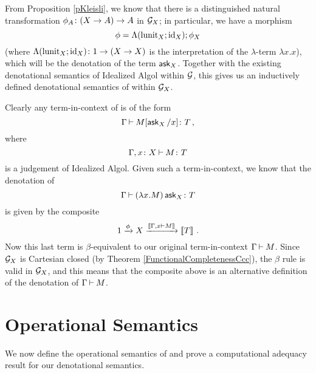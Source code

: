 From Proposition \ref{pKleisli}, we know that there is a distinguished natural transformation $\phi_A \colon (X \to A) \to A$ in $\mathcal G_X$; in particular, we have a morphism
\[
  \phi = \Lambda(\operatorname{lunit}_X;\operatorname{id}_X);\phi_X
  \]
(where $\Lambda(\operatorname{lunit}_X;\operatorname{id}_X)\colon 1 \to (X \to X)$ is the interpretation of the $\lambda$-term $\lambda x.x$), which will be the denotation of the term $\operatorname{{\mathsf{ask}}}_X$.
Together with the existing denotational semantics of Idealized Algol within $\mathcal G$, this gives us an inductively defined denotational semantics of \IAX within $\mathcal G_X$.

Clearly any term-in-context of \IAX is of the form
\[
  \Gamma \mathbin{\vdash} M[\operatorname{{\mathsf{ask}}}_X/x]\colon T\,,
  \]
where
\[
  \Gamma,x\colon X \mathbin{\vdash} M \colon T
  \]
is a judgement of Idealized Algol.
Given such a term-in-context, we know that the denotation of
\[
  \Gamma\mathbin{\vdash} (\lambda x.M) \operatorname{{\mathsf{ask}}}_X \colon T
  \]
is given by the composite
\[
  1 \xrightarrow{\phi}
  X \xrightarrow{\left\llbracket\Gamma,x \mathbin{\vdash} M\right\rrbracket}
  \left\llbracket T\right\rrbracket\,.
  \]
Now this last term is $\beta$-equivalent to our original term-in-context $\Gamma\mathbin{\vdash} M$.  
Since $\mathcal G_X$ is Cartesian closed (by Theorem \ref{FunctionalCompletenessCcc}), the $\beta$ rule is valid in $\mathcal G_X$, and this means that the composite above is an alternative definition of the denotation of $\Gamma\mathbin{\vdash} M$.

\section{Operational Semantics}

We now define the operational semantics of \IAX and prove a computational adequacy result for our denotational semantics.

